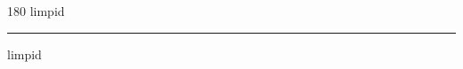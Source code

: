 
\begin{frame}
\begin{center}
\begin{turn}{180}
{\fontsize{2.5cm}{1em}\selectfont limpid}
\end{turn}
\vspace{1em}\par  
\hrule
\vspace{1em}\par  
{\fontsize{2.5cm}{1em}\selectfont limpid}
\end{center}
\end{frame}
